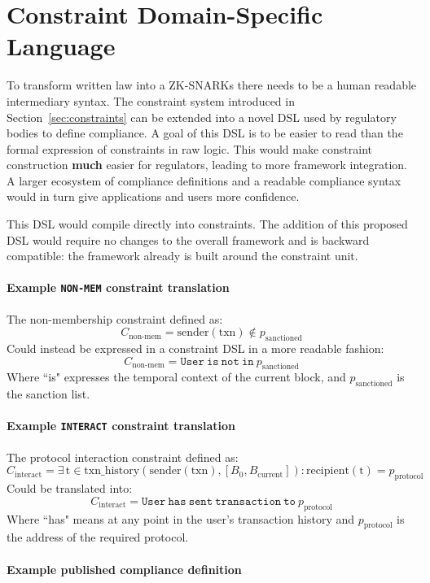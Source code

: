 \documentclass[9pt]{extreport}
\begin{document}
\section{Constraint Domain-Specific Language}
\label{sec:DSL}
To transform written law into a ZK-SNARKs there needs to be a human readable intermediary syntax.  The constraint system introduced in Section~\ref{sec:constraints} can be extended into a novel DSL used by regulatory bodies to define compliance.  A goal of this DSL is to be easier to read than the formal expression of constraints in raw logic.  This would make constraint construction \textbf{much} easier for regulators, leading to more framework integration.  A larger ecosystem of compliance definitions and a readable compliance syntax would in turn give applications and users more confidence.

This DSL would compile directly into constraints.  The addition of this proposed DSL would require no changes to the overall framework and is backward compatible: the framework already is built around the constraint unit.

\paragraph{Example \texttt{NON-MEM} constraint translation} 

The non-membership constraint defined as:
$$C_{\text{non-mem}} = \text{sender}(\text{txn}) \notin p_{\text{sanctioned}}$$
Could instead be expressed in a constraint DSL in a more readable fashion:
$$C_{\text{non-mem}} = \mathtt{User\ is\ not\ in\ } p_{\text{sanctioned}}$$
Where ``is" expresses the temporal context of the current block, and $p_{\text{sanctioned}}$ is the sanction list.

\paragraph{Example \texttt{INTERACT} constraint translation} 

The protocol interaction constraint defined as:
$$C_{\text{interact}} = \exists \, \text{t} \in \text{txn\_history}(\text{sender}(\text{txn}), [B_0, B_{\text{current}}]) : \text{recipient}(\text{t}) = p_{\text{protocol}}$$
Could be translated into:
$$C_{\text{interact}} = \mathtt{User\ has\ sent\ transaction\ to\ } p_{\text{protocol}}$$
Where ``has" means at any point in the user's transaction history and $p_{\text{protocol}}$ is the address of the required protocol.

\paragraph{Example published compliance definition}
\end{document}
